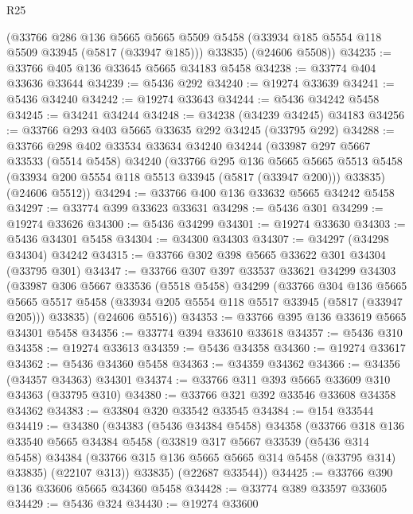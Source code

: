 \begin{lexlean}{R25}
\begin{coremodule}
      (@33766
        @286
        @136
        @5665
        @5665
        @5509
        @5458
        (@33934 @185 @5554 @118 @5509 @33945 (@5817 (@33947 @185)))
        @33835)
      (@24606 @5508))
@34235 := @33766 @405 @136 @33645 @5665 @34183 @5458
@34238 := @33774 @404 @33636 @33644
@34239 := @5436 @292
@34240 := @19274 @33639
@34241 := @5436 @34240
@34242 := @19274 @33643
@34244 := @5436 @34242 @5458
@34245 := @34241 @34244
@34248 := @34238 (@34239 @34245) @34183
@34256 := @33766 @293 @403 @5665 @33635 @292 @34245 (@33795 @292)
@34288 := @33766
    @298
    @402
    @33534
    @33634
    @34240
    @34244
    (@33987
      @297
      @5667
      @33533
      (@5514 @5458)
      @34240
      (@33766
        @295
        @136
        @5665
        @5665
        @5513
        @5458
        (@33934 @200 @5554 @118 @5513 @33945 (@5817 (@33947 @200)))
        @33835)
      (@24606 @5512))
@34294 := @33766 @400 @136 @33632 @5665 @34242 @5458
@34297 := @33774 @399 @33623 @33631
@34298 := @5436 @301
@34299 := @19274 @33626
@34300 := @5436 @34299
@34301 := @19274 @33630
@34303 := @5436 @34301 @5458
@34304 := @34300 @34303
@34307 := @34297 (@34298 @34304) @34242
@34315 := @33766 @302 @398 @5665 @33622 @301 @34304 (@33795 @301)
@34347 := @33766
    @307
    @397
    @33537
    @33621
    @34299
    @34303
    (@33987
      @306
      @5667
      @33536
      (@5518 @5458)
      @34299
      (@33766
        @304
        @136
        @5665
        @5665
        @5517
        @5458
        (@33934 @205 @5554 @118 @5517 @33945 (@5817 (@33947 @205)))
        @33835)
      (@24606 @5516))
@34353 := @33766 @395 @136 @33619 @5665 @34301 @5458
@34356 := @33774 @394 @33610 @33618
@34357 := @5436 @310
@34358 := @19274 @33613
@34359 := @5436 @34358
@34360 := @19274 @33617
@34362 := @5436 @34360 @5458
@34363 := @34359 @34362
@34366 := @34356 (@34357 @34363) @34301
@34374 := @33766 @311 @393 @5665 @33609 @310 @34363 (@33795 @310)
@34380 := @33766 @321 @392 @33546 @33608 @34358 @34362
@34383 := @33804 @320 @33542 @33545
@34384 := @154 @33544
@34419 := @34380
    (@34383
      (@5436 @34384 @5458)
      @34358
      (@33766
        @318
        @136
        @33540
        @5665
        @34384
        @5458
        (@33819
          @317
          @5667
          @33539
          (@5436 @314 @5458)
          @34384
          (@33766 @315 @136 @5665 @5665 @314 @5458 (@33795 @314) @33835)
          (@22107 @313))
        @33835)
      (@22687 @33544))
@34425 := @33766 @390 @136 @33606 @5665 @34360 @5458
@34428 := @33774 @389 @33597 @33605
@34429 := @5436 @324
@34430 := @19274 @33600

\end{coremodule}
\end{lexlean}
